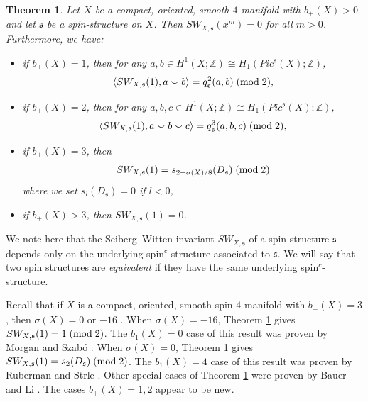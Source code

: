 \documentclass{amsart}
\newtheorem{theorem}{Theorem}[section]
\theoremstyle{definition}
\theoremstyle{remark}
\numberwithin{equation}{section}
\begin{document}
\begin{theorem}\label{thm:thm1}
Let $X$ be a compact, oriented, smooth $4$-manifold with $b_+(X) > 0$ and let $\mathfrak{s}$ be a spin-structure on $X$. Then $SW_{X,\mathfrak{s}}(x^m) = 0$ for all $m > 0$. Furthermore, we have:
\begin{itemize}
\item[(1)]{if $b_+(X) = 1$, then for any $a,b \in H^1(X ; \mathbb{Z}) \cong H_1(Pic^{\mathfrak{s}}(X) ; \mathbb{Z})$,
\[
\langle SW_{X,\mathfrak{s}}(1) , a \smallsmile b \rangle = q^2_{\mathfrak{s}}( a , b) \; ({\rm mod} \; 2),
\]
}
\item[(2)]{if $b_+(X) = 2$, then for any $a,b,c \in H^1(X ; \mathbb{Z}) \cong H_1(Pic^{\mathfrak{s}}(X) ; \mathbb{Z})$,
\[
\langle SW_{X,\mathfrak{s}}(1) , a \smallsmile b \smallsmile c \rangle = q^3_{\mathfrak{s}}( a , b , c) \; ({\rm mod} \; 2),
\]
}
\item[(3)]{if $b_+(X) = 3$, then 
\[
SW_{X,\mathfrak{s}}( 1 ) = s_{2+\sigma(X)/8}(D_\mathfrak{s}) \; ({\rm mod} \; 2)
\]
where we set $s_l(D_\mathfrak{s}) = 0$ if $l < 0$,}
\item[(4)]{if $b_+(X) > 3$, then $SW_{X,\mathfrak{s}}(1) = 0$.}
\end{itemize}

\end{theorem}

We note here that the Seiberg--Witten invariant $SW_{X , \mathfrak{s}}$ of a spin structure $\mathfrak{s}$ depends only on the underlying spin$^c$-structure associated to $\mathfrak{s}$. We will say that two spin structures are {\em equivalent} if they have the same underlying spin$^c$-structure. 

Recall that if $X$ is a compact, oriented, smooth spin $4$-manifold with $b_+(X) = 3$, then $\sigma(X) = 0$ or $-16$ \cite{fur}. When $\sigma(X) = -16$, Theorem \ref{thm:thm1} gives $SW_{X , \mathfrak{s}}(1) = 1 \; ({\rm mod} \; 2)$. The $b_1(X) = 0$ case of this result was proven by Morgan and Szab\'o \cite{ms}. When $\sigma(X) = 0$, Theorem \ref{thm:thm1} gives $SW_{X , \mathfrak{s}}(1) = s_2(D_\mathfrak{s}) \; ({\rm mod} \; 2)$. The $b_1(X) = 4$ case of this result was proven by Ruberman and Strle \cite{rs}. Other special cases of Theorem \ref{thm:thm1} were proven by Bauer \cite{bau} and Li \cite{li}. The cases $b_+(X) = 1,2$ appear to be new.
\end{document}
